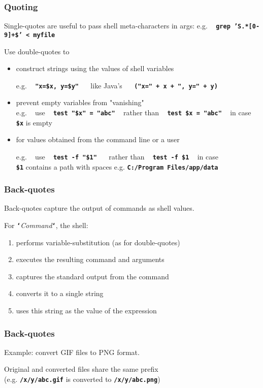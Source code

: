\begin{frame}
\frametitle{Quoting}
Single-quotes are useful to pass shell meta-characters in args:
e.g. ~ \textbf{\tt{grep 'S.*[0-9]+\$' < myfile}}

Use double-quotes to
\begin{itemize}
\item  construct strings using the values of shell variables 

{\small e.g. ~ \textbf{\tt{"x=\$x, y=\$y"}} ~~ like Java's ~~ \textbf{\tt{("x=" + x + ", y=" + y)}}}
\item  prevent empty variables from "vanishing" \\

{\small e.g. ~ use ~ \textbf{\tt{test "\$x" = "abc"}} ~ rather than ~ \textbf{\tt{test \$x = "abc"}} ~ in case \textbf{\tt{\$x}} is empty}
\item  for values obtained from the command line or a user

{\small e.g. ~ use ~ \textbf{\tt{test -f "\$1" }} ~ rather than ~ \textbf{\tt{test -f \$1}} ~ in case \\
	\textbf{\tt{\$1}} contains a path with spaces e.g. \textbf{\tt{C:/Program Files/app/data}}}
\end{itemize}
\end{frame}

\begin{frame}
\frametitle{Back-quotes}
Back-quotes capture the output of commands as shell values.

For \textbf{\tt{`}}{\it{Command}}\textbf{\tt{`}}, the shell:
\begin{enumerate}
\item  performs variable-substitution (as for double-quotes)
\item  executes the resulting command and arguments
\item  captures the standard output from the command
\item  converts it to a single string
\item  uses this string as the value of the expression
\end{enumerate}
\end{frame}

\begin{frame}[fragile]
\frametitle{Back-quotes}
Example: convert GIF files to PNG format.

Original and converted files share the same prefix \\
(e.g. \textbf{\tt{/x/y/abc.gif}} is converted to \textbf{\tt{/x/y/abc.png}})

\end{frame}

